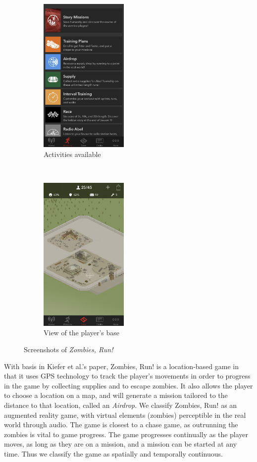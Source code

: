 \begin{figure}[h]
	\centering
	\begin{subfigure}{0.45\textwidth}
		\centering
		\includegraphics[height=3in]{Figures/zombies-run-activities}
		\caption{Activities available}
	\end{subfigure}
	~
	\begin{subfigure}{0.45\textwidth}
		\centering
		\includegraphics[height=3in]{Figures/zombies-run-base}
		\caption{View of the player's base}
	\end{subfigure}
	\caption{Screenshots of \emph{Zombies, Run!}}
\end{figure}

With basis in Kiefer et al.'s \cite{kiefer2006systematically} paper, Zombies, Run! is a location-based game in that it uses GPS technology to track the player's movements in order to progress in the game by collecting supplies and to escape zombies. It also allows the player to choose a location on a map, and will generate a mission tailored to the distance to that location, called an \emph{Airdrop}. We classify Zombies, Run! as an augmented reality game, with virtual elements (zombies) perceptible in the real world through audio. The game is closest to a chase game, as outrunning the zombies is vital to game progress. The game progresses continually as the player moves, as long as they are on a mission, and a mission can be started at any time. Thus we classify the game as spatially and temporally continuous.

